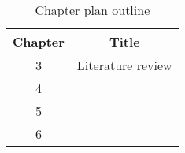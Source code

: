 \begin{table}[h!]
\centering
\begin{tabular}{cc}
{Chapter} & {Title} \\ \midrule
{3} & {Literature review} \\
{4} & {} \\
{5} & {} \\
{6} & {} \\
\end{tabular}
\caption{Chapter plan outline}
\label{table:1}
\end{table}